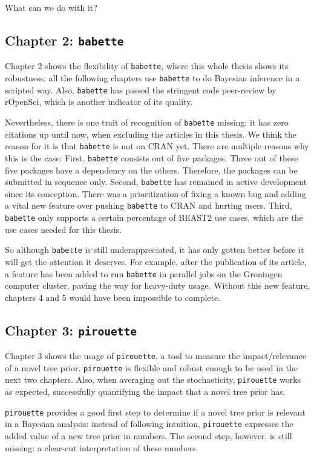 What can we do with it?


\subsection{Chapter 2: \texttt{babette}}

Chapter 2 shows the flexibility of \verb;babette;, where this whole thesis
shows its robustness: all the following chapters use \verb;babette; to
do Bayesian inference in a scripted way. Also, \verb;babette; has passed
the stringent code peer-review by rOpenSci, which is another indicator of 
its quality.

Nevertheless, there is one trait of recognition of \verb;babette; missing:
it has zero citations up until now, when excluding the articles in this 
thesis. We think the reason for it is that \verb;babette; is
not on CRAN yet. There are multiple reasons why this is the case:
First, \verb;babette; consists out of five packages. Three out of these
five packages have a dependency on the others. Therefore, the packages can
be submitted in sequence only. Second, \verb;babette; has remained in active 
development since its conception. There was a prioritization of 
fixing a known bug and adding a vital new feature over 
pushing \verb;babette; to CRAN and hurting users. Third, \verb;babette;
only supports a certain percentage of BEAST2 use cases, which are the
use cases needed for this thesis. 

So although \verb;babette; is still underappreciated, it has only gotten
better before it will get the attention it deserves. 
For example, after the publication of its article, 
a feature has been added to run \verb;babette; in parallel
jobs on the Groningen computer cluster, paving the way for heavy-duty 
usage. Without this new feature, chapters 4 and 5 would have been
impossible to complete.

\subsection{Chapter 3: \texttt{pirouette}}

Chapter 3 shows the usage of \verb;pirouette;, a tool to measure the
impact/relevance of a novel tree prior. \verb;pirouette; is flexible and
robust enough to be used in the next two chapters. Also, when averaging
out the stochasticity, \verb;pirouette; works as expected, successfully
quantifying the impact that a novel tree prior has.

\verb;pirouette; provides a good first step to determine 
if a novel tree prior is relevant in a Bayesian analysis:
instead of following intuition, \verb;pirouette; expresses 
the added value of a new tree prior in numbers. The second step,
however, is still missing: a clear-cut interpretation of these numbers.

